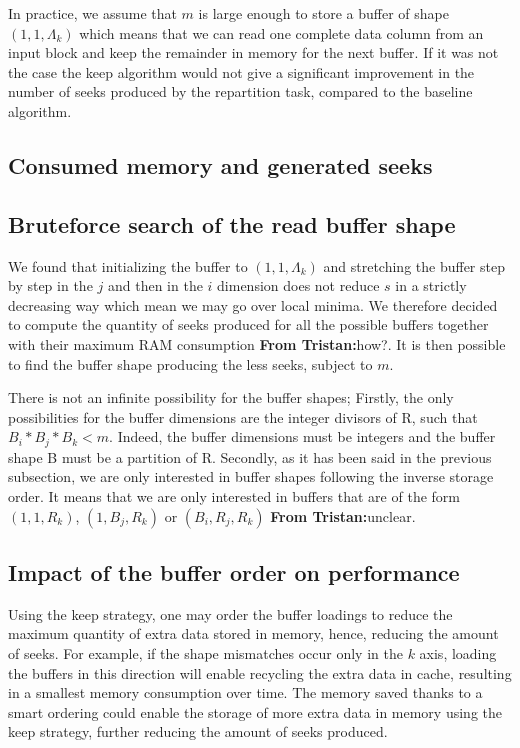 \documentclass[sigconf, nonacm]{acmart}
\newcommand{\tristan}[1]{\color{orange}\textbf{From Tristan:}#1\color{black}}
\begin{document}
In practice, we assume that $m$ is large enough to store a buffer of shape
$(1,1,\Lambda_k)$ which means that we can read one complete data column from an
input block and keep the remainder in memory for the next buffer.
If it was not the case the keep algorithm would not give a significant
improvement in the number of seeks produced by the repartition task, compared
to the baseline algorithm.

\subsection{Consumed memory and generated seeks}

\subsection{Bruteforce search of the read buffer shape}
We found that initializing the buffer to $(1,1,\Lambda_k)$ and stretching the
buffer step by step in the $j$ and then in the $i$ dimension does not reduce
$s$ in a strictly decreasing way which mean we may go over local minima.
We therefore decided to compute the quantity of seeks produced for all the
possible buffers together with their maximum RAM consumption \tristan{how?}.
It is then possible to find the buffer shape producing the less seeks, subject
to $m$.

There is not an infinite possibility for the buffer shapes;
Firstly, the only possibilities for the buffer dimensions are the integer
divisors of R, such that $B_i*B_j*B_k < m$. Indeed, the buffer dimensions must
be integers and the buffer shape B must be a partition of R.
Secondly, as it has been said in the previous subsection, we are only
interested in buffer shapes following the inverse storage order.
It means that we are only interested in buffers that are of the form
$(1,1,R_k)$, $(1,B_j,R_k)$ or $(B_i,R_j,R_k)$ \tristan{unclear}.

\subsection{Impact of the buffer order on performance}
Using the keep strategy, one may order the buffer loadings to reduce the maximum
quantity of extra data stored in memory, hence, reducing the amount of seeks.
For example, if the shape mismatches occur only in the $k$ axis, loading the
buffers in this direction will enable recycling the extra data in cache,
resulting in a smallest memory consumption over time.
The memory saved thanks to a smart
ordering could enable the storage of more extra data in memory using the
keep strategy, further reducing the amount of seeks produced.
\end{document}
